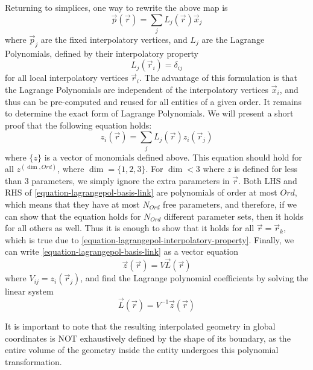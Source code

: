 \noindent
Returning to simplices, one way to rewrite the above map is
\begin{equation}
	\vec{p}(\vec{r}) = \sum_j L_j(\vec{r})\vec{x}_j 
\end{equation}
\noindent
where $\vec{p}_j $ are the fixed interpolatory vertices, and $L_j$ are the Lagrange Polynomials, defined by their interpolatory property
\begin{equation}
	\label{equation-lagrangepol-interpolatory-property}
	L_j(\vec{r}_i) = \delta_{ij}
\end{equation}
\noindent
for all local interpolatory vertices $\vec{r}_i$. The advantage of this formulation is that the Lagrange Polynomials are independent of the interpolatory vertices $\vec{x}_i$, and thus can be pre-computed and reused for all entities of a given order. It remains to determine the exact form of Lagrange Polynomials. We will present a short proof that the following equation holds:
\begin{equation}
	\label{equation-lagrangepol-basis-link}
	z_i(\vec{r}) = \sum_j L_j(\vec{r}) z_i (\vec{r}_j) 
\end{equation}
\noindent
where $\{z\}$ is a vector of monomials defined above. This equation should hold for all $z^{(\dim, Ord)}$, where $\dim = \{1,2,3\}$. For $\dim < 3$ where $z$ is defined for less than 3 parameters, we simply ignore the extra parameters in $\vec{r}$. Both LHS and RHS of \eqref{equation-lagrangepol-basis-link} are polynomials of order at most $Ord$, which means that they have at most $N_{Ord}$ free parameters, and therefore, if we can show that the equation holds for $N_{Ord}$ different parameter sets, then it holds for all others as well. Thus it is enough to show that it holds for all $\vec{r} = \vec{r}_k$, which is true due to \eqref{equation-lagrangepol-interpolatory-property}. Finally, we can write \eqref{equation-lagrangepol-basis-link} as a vector equation
\begin{equation}
	\vec{z} (\vec{r}) = V \vec{L} (\vec{r})
\end{equation}
\noindent
where $V_{ij} = z_i (\vec{r}_j)$, and find the Lagrange polynomial coefficients by solving the linear system
\begin{equation}
	\vec{L} (\vec{r}) = V^{-1} \vec{z} (\vec{r})
\end{equation}

\noindent
It is important to note that the resulting interpolated geometry in global coordinates is NOT exhaustively defined by the shape of its boundary, as the entire volume of the geometry inside the entity undergoes this polynomial transformation.


